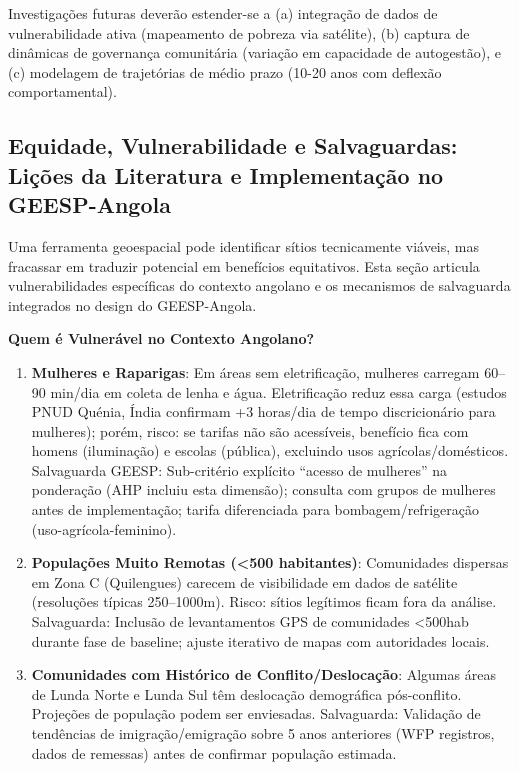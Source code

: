 \documentclass[12pt, a4paper]{article}
\begin{document}
\begin{itemize}
Investigações futuras deverão estender-se a (a) integração de dados de vulnerabilidade 
ativa (mapeamento de pobreza via satélite), (b) captura de dinâmicas de governança 
comunitária (variação em capacidade de autogestão), e (c) modelagem de trajetórias 
de médio prazo (10-20 anos com deflexão comportamental).

\subsection{Equidade, Vulnerabilidade e Salvaguardas: Lições da Literatura e Implementação no GEESP-Angola}

Uma ferramenta geoespacial pode identificar sítios tecnicamente viáveis, mas fracassar em traduzir potencial em benefícios equitativos. Esta seção articula vulnerabilidades específicas do contexto angolano e os mecanismos de salvaguarda integrados no design do GEESP-Angola.

\textbf{Quem é Vulnerável no Contexto Angolano?}

\begin{enumerate}
\item \textbf{Mulheres e Raparigas}: Em áreas sem eletrificação, mulheres carregam 60--90 min/dia em coleta de lenha e água. Eletrificação reduz essa carga (estudos PNUD Quénia, Índia confirmam +3 horas/dia de tempo discricionário para mulheres); porém, risco: se tarifas não são acessíveis, benefício fica com homens (iluminação) e escolas (pública), excluindo usos agrícolas/domésticos. Salvaguarda GEESP: Sub-critério explícito ``acesso de mulheres'' na ponderação (AHP incluiu esta dimensão); consulta com grupos de mulheres antes de implementação; tarifa diferenciada para bombagem/refrigeração (uso-agrícola-feminino).

\item \textbf{Populações Muito Remotas (<500 habitantes)}: Comunidades dispersas em Zona C (Quilengues) carecem de visibilidade em dados de satélite (resoluções típicas 250--1000m). Risco: sítios legítimos ficam fora da análise. Salvaguarda: Inclusão de levantamentos GPS de comunidades <500hab durante fase de baseline; ajuste iterativo de mapas com autoridades locais.

\item \textbf{Comunidades com Histórico de Conflito/Deslocação}: Algumas áreas de Lunda Norte e Lunda Sul têm deslocação demográfica pós-conflito. Projeções de população podem ser enviesadas. Salvaguarda: Validação de tendências de imigração/emigração sobre 5 anos anteriores (WFP registros, dados de remessas) antes de confirmar população estimada.


\end{enumerate}
\end{itemize}
\end{document}
